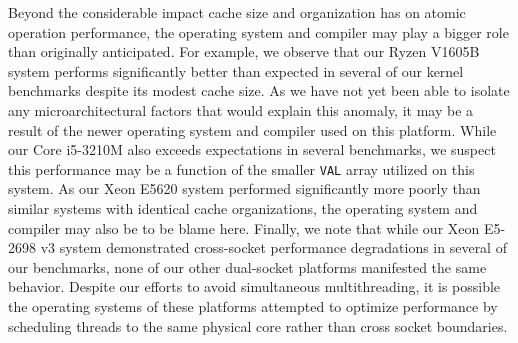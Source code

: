 Beyond the considerable impact cache size and organization has on atomic operation performance, the operating system and compiler may play a bigger role than originally anticipated.
For example, we observe that our Ryzen V1605B system performs significantly better than expected in several of our kernel benchmarks despite its modest cache size.
As we have not yet been able to isolate any microarchitectural factors that would explain this anomaly, it may be a result of the newer operating system and compiler used on this platform.
While our Core i5-3210M also exceeds expectations in several benchmarks, we suspect this performance may be a function of the smaller \texttt{VAL} array utilized on this system.
As our Xeon E5620 system performed significantly more poorly than similar systems with identical cache organizations, the operating system and compiler may also be to be blame here.
Finally, we note that while our Xeon E5-2698 v3 system demonstrated cross-socket performance degradations in several of our benchmarks, none of our other dual-socket platforms manifested the same behavior.
Despite our efforts to avoid simultaneous multithreading, it is possible the operating systems of these platforms attempted to optimize performance by scheduling threads to the same physical core rather than cross socket boundaries.
